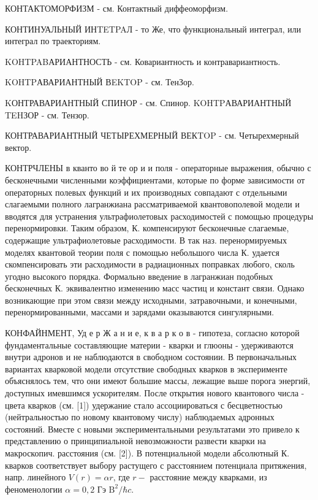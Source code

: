 \documentclass[10pt]{article}
\begin{document}
КОНТАКТОМОРФИЗМ - см. Контактный диффеомор$ф и з м$.



КОНТИНУАЛЬНЫЙ ИНTETPAЛ - то Же, что функциональный интеграл, или интеграл по траекториям.



KOHTPABАРИАНТНОСТЬ - см. Ковариантность и контравариантность.



KOHTPАВАРИАНТНЫЙ ВEKTOP - см. ТенЗор.



KОНТРАВАРИАНТНЫЙ СПИНОР - см. Спинор. KOHTPАВАРИАНТНЫЙ TEHЗОР - см. Тензор.



КОНТРАВАРИАНТНЫЙ ЧЕТЫРЕХМЕРНЫЙ ВЕКTOP - см. Четырехмерный вектор.



КОНТРЧЛЕНЫ в кванто во й те ор и и поля - операторные выражения, обычно с бесконечными численными коэффициентами, которые по форме зависимости от операторных полевых функций и их производных совпадают с отдельными слагаемыми полного лагранжиана рассматриваемой квантовополевой модели и вводятся для устранения ультрафиолетовых расходимостей с помощью процедуры перенормировки. Таким образом, К. компенсируют бесконечные слагаемые, содержащие ультрафиолетовые расходимости. В так наз. перенормируемых моделях квантовой теории поля с помощью небольшого числа К. удается скомпенсировать эти расходимости в радиационных поправках любого, сколь угодно высокого порядка. Формально введение в лагранжиан подобных бесконечных К. эквивалентно изменению масс частиц и констант связи. Однако возникающие при этом связи между исходными, затравочными, и конечными, перенормированными, массами и зарядами оказываются сингулярными.



КОНФАЙНМЕНТ, Уд е р Ж а н и е, к в а р к о в - гипотеза, согласно которой фундаментальные составляющие материи - кварки и глюоны - удерживаются внутри адронов и не наблюдаются в свободном состоянии. В первоначальных вариантах кварковой модели отсутствие свободных кварков в эксперименте объяснялось тем, что они имеют большие массы, лежащие выше порога энергий, доступных имевшимся ускорителям. После открытия нового квантового числа - цвета кварков (см. [1]) удержание стало ассоциироваться с бесцветностью (нейтральностью по новому квантовому числу) наблюдаемых адронных состояний. Вместе с новыми экспериментальными результатами это привело к представлению о принципиальной невозможности развести кварки на макроскопич. расстояния (см. [2]). В потенциальной модели абсолютный К. кварков соответствует выбору растущего с расстоянием потенциала притяжения, напр. линейного $V(r)=\alpha r$, где $r-$ расстояние между кварками, из феноменологии $\alpha=0,2$ Гэ $\mathrm{B}^{2} / \hbar c$.
\end{document}
